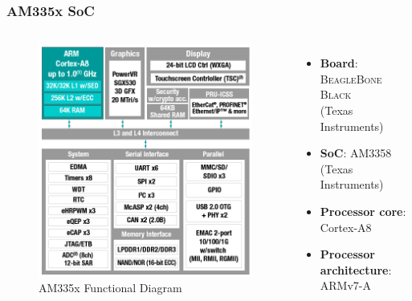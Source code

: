 \documentclass[aspectratio=169]{beamer}
\begin{document}
\begin{frame}
  \frametitle{AM335x SoC}
  \begin{columns}
      \begin{figure}
        \centering
        \includegraphics[scale=0.4]{images/am335x.png}
        \caption{AM335x Functional Diagram}
      \end{figure}
      \vspace*{-12mm} %
      \begin{itemize}
        \item \textbf{Board}: \textsc{BeagleBone Black} \\ (Texas Instruments)
        \item \textbf{SoC}: AM3358 (Texas Instruments)
        \item \textbf{Processor core}: Cortex-A8
        \item \textbf{Processor architecture}: ARMv7-A
      \end{itemize}
  \end{columns}
\end{frame}
\end{document}
